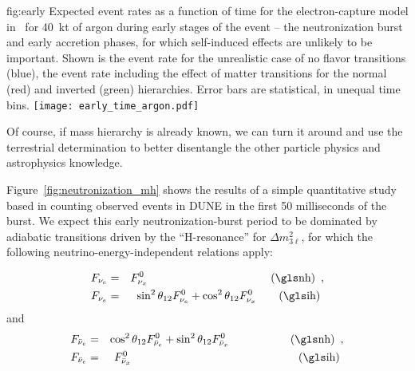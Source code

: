 \begin{dunefigure}{fig:early}
{Expected event rates as a function of time for the electron-capture model in~\cite{Huedepohl:2009wh} for \SI{40}{kt} of argon during early stages of the event -- the neutronization burst and early accretion phases, for which self-induced effects are unlikely to be important.  Shown is the event rate for the unrealistic case of no flavor transitions (blue), the event rate including the effect of matter transitions for the normal (red)  and inverted (green) hierarchies.  Error bars are statistical, in unequal time bins.}
\texttt{[image: early\_time\_argon.pdf]}
\end{dunefigure}

Of course, if mass hierarchy is already known, we can turn it around 
and use the terrestrial determination to better disentangle the other 
particle physics and astrophysics knowledge. 




Figure~\ref{fig:neutronization_mh} shows the results of a simple quantitative study
based in counting observed events in DUNE in the first 50 milliseconds
of the burst.  We expect this early neutronization-burst period to be
dominated by adiabatic  transitions driven by the ``H-resonance''
for $\Delta m^2_{3\ell}$, for which the following
neutrino-energy-independent relations apply:

\begin{eqnarray}  
 F_{\nu_e} &=& F^0_{\nu_x} \,\ \,\ \,\ \,\ \,\ \,\ \,\ \,\  \,\ \,\ \,\ \,\   \,\ \,\  \,\ \,\ \,\ \,\ \,\ \,\  \,\ \,\ \textrm{(\dword{nh})} \,\ , \label{eq:msw_nmo}\\
 F_{\nu_e} &=&  \sin^2 \theta_{12} F^0_{\nu_e} +
\cos^2 \theta_{12} F^0_{\nu_x}  \,\ \,\ \,\ \,\ \textrm{(\dword{ih})} \,\,
\label{eq:msw_imo}
\end{eqnarray} 
 and 
\begin{eqnarray}  
 F_{\bar\nu_e} &=& \cos^2 \theta_{12} F^0_{\bar\nu_e} + \sin^2 \theta_{12} F^0_{\bar\nu_x}   \,\   \,\ \,\  \,\ \,\ \,\ \,\ \,\ \,\  \,\ \,\ \textrm{(\dword{nh})} \,\ , \label{eq:msw_nmo_anti}\\
 F_{\bar\nu_e} &=&   F^0_{\bar\nu_x}  \,\ \,\ \,\ \,\ \,\ \,\ \,\ \,\ \,\ \,\ \,\ \,\ \,\ \,\ \,\ \,\ 
 \,\ \,\ \,\ \,\ \,\ \,\ \,\ \,\ \,\ \,\ \,\ \,\ \,\  \,\
\textrm{(\dword{ih})} \,\,\label{eq:msw_imo_anti}
\end{eqnarray} 

